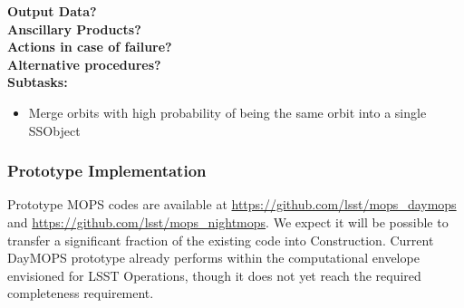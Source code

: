 \noindent
{\bf Output Data?}\\
{\bf Anscillary Products?}\\
{\bf Actions in case of failure?}\\
{\bf Alternative procedures?}\\

\noindent
{\bf Subtasks:}
\begin{itemize}
\item Merge orbits with high probability of being the same orbit into a single SSObject
\end{itemize}

\subsubsection{Prototype Implementation}

Prototype MOPS codes are available at \url{https://github.com/lsst/mops_daymops} and \url{https://github.com/lsst/mops_nightmops}. We expect it will be possible to transfer a significant fraction of the existing code into Construction. Current DayMOPS prototype already performs within the computational envelope envisioned for LSST Operations, though it does not yet reach the required completeness requirement.
